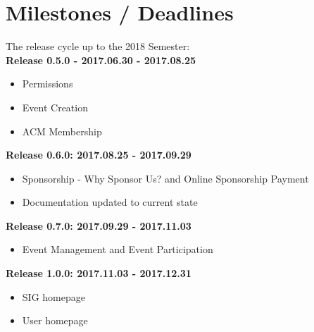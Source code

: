 \documentclass{article}
\begin{document}
\section{Milestones / Deadlines}
The release cycle up to the 2018 Semester:
\\
\textbf{Release 0.5.0 - 2017.06.30 - 2017.08.25}
\begin{itemize}
    \item Permissions
    \item Event Creation
    \item ACM Membership
\end{itemize}
\textbf{Release 0.6.0: 2017.08.25 - 2017.09.29}
\begin{itemize}
    \item Sponsorship - Why Sponsor Us? and Online Sponsorship Payment
    \item Documentation updated to current state
\end{itemize}
\textbf{Release 0.7.0: 2017.09.29 - 2017.11.03}
\begin{itemize}
    \item Event Management and Event Participation 
\end{itemize}
\textbf{Release 1.0.0: 2017.11.03 - 2017.12.31}
\begin{itemize}
    \item SIG homepage 
    \item User homepage
\end{itemize}
\end{document}
